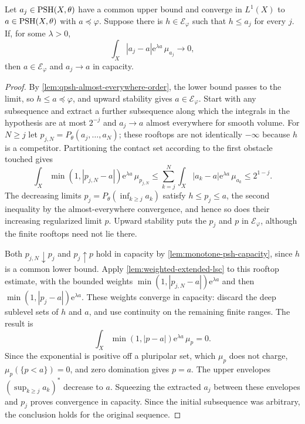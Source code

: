 \begin{lemma}\label{lem:big-weighted-common-bound}
Let $a_j\in\mathrm{PSH}(X,\theta)$ have a common upper bound and converge in $L^1(X)$ to $a\in\mathrm{PSH}(X,\theta)$ with $a\preceq\varphi$. Suppose there is $h\in\mathcal E_\varphi$ such that $h\leq a_j$ for every $j$. If, for some $\lambda>0$,
\[
 \int_X|a_j-a|\mathrm{e}^{\lambda a}\,\mu_{a_j}\longrightarrow0,
\]
then $a\in\mathcal E_\varphi$ and $a_j\to a$ in capacity.
\end{lemma}
\begin{proof}
By \cref{lem:qpsh-almost-everywhere-order}, the lower bound passes to the limit, so $h\leq a\preceq\varphi$, and upward stability gives $a\in\mathcal E_\varphi$. Start with any subsequence and extract a further subsequence along which the integrals in the hypothesis are at most $2^{-j}$ and $a_j\to a$ almost everywhere for smooth volume. For $N\geq j$ let $p_{j,N}=P_\theta(a_j,\ldots,a_N)$; these rooftops are not identically $-\infty$ because $h$ is a competitor. Partitioning the contact set according to the first obstacle touched gives
\[
 \int_X\min(1,|p_{j,N}-a|)\mathrm{e}^{\lambda a}\,\mu_{p_{j,N}}
 \leq\sum_{k=j}^N\int_X|a_k-a|\mathrm{e}^{\lambda a}\,\mu_{a_k}
 \leq2^{1-j}.
\]
The decreasing limits $p_j=P_\theta(\inf_{k\geq j}a_k)$ satisfy $h\leq p_j\leq a$, the second inequality by the almost-everywhere convergence, and hence so does their increasing regularized limit $p$. Upward stability puts the $p_j$ and $p$ in $\mathcal E_\varphi$, although the finite rooftops need not lie there.

Both $p_{j,N}\downarrow p_j$ and $p_j\uparrow p$ hold in capacity by \cref{lem:monotone-psh-capacity}, since $h$ is a common lower bound. Apply \cref{lem:weighted-extended-lsc} to this rooftop estimate, with the bounded weights $\min(1,|p_{j,N}-a|)\mathrm{e}^{\lambda a}$ and then $\min(1,|p_j-a|)\mathrm{e}^{\lambda a}$. These weights converge in capacity: discard the deep sublevel sets of $h$ and $a$, and use continuity on the remaining finite ranges. The result is
\[
 \int_X\min(1,|p-a|)\mathrm{e}^{\lambda a}\,\mu_p=0.
\]
Since the exponential is positive off a pluripolar set, which $\mu_p$ does not charge, $\mu_p(\{p<a\})=0$, and zero domination gives $p=a$. The upper envelopes $(\sup_{k\geq j}a_k)^*$ decrease to $a$. Squeezing the extracted $a_j$ between these envelopes and $p_j$ proves convergence in capacity. Since the initial subsequence was arbitrary, the conclusion holds for the original sequence.
\end{proof}

